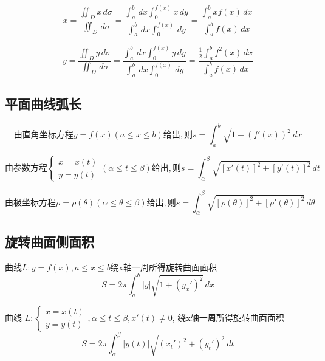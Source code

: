 \begin{displaymath}
\overline{x} = \frac{\iint_{D} x \,d\sigma}{\iint_{D} \,d\sigma} = 
\frac{\int_{a}^{b} \,dx \int_{0}^{f(x)} x \,dy}{\int_{a}^{b} \,dx \int_{0}^{f(x)} \,dy} =
\frac{\int_{a}^{b} xf(x) \,dx}{\int_{a}^{b} f(x) \,dx}
\end{displaymath}

\begin{displaymath}
\overline{y} = \frac{\iint_{D} y \,d\sigma}{\iint_{D} \,d\sigma} = 
\frac{\int_{a}^{b} \,dx \int_{0}^{f(x)} y \,dy}{\int_{a}^{b} \,dx \int_{0}^{f(x)} \,dy} =
\frac{\frac{1}{2}\int_{a}^{b} f^2(x) \,dx}{\int_{a}^{b} f(x) \,dx}
\end{displaymath}


\subsection{平面曲线弧长}

\begin{displaymath}
由直角坐标方程y = f(x)(a \leq x \leq b)给出,
则s = \int_{a}^{b} \sqrt{1 + (f'(x))^2} \,dx
\end{displaymath}

\begin{displaymath}
由参数方程
\begin{cases}
x = x(t) \\
y = y(t)
\end{cases}
(\alpha \leq t \leq \beta)给出,
则s = \int_{\alpha}^{\beta} \sqrt{[x'(t)]^2 + [y'(t)]^2} \,dt
\end{displaymath}

\begin{displaymath}
由极坐标方程\rho = \rho(\theta)(\alpha \leq \theta \leq \beta)给出,
则s = \int_{\alpha}^{\beta} \sqrt{[\rho(\theta)]^2 + [\rho'(\theta)]^2} \,d\theta
\end{displaymath}


\subsection{旋转曲面侧面积}

曲线\(L : y = f(x), a \leq x \leq b\)绕x轴一周所得旋转曲面面积
\begin{displaymath}
S = 2\pi \int_{a}^{b}|y|\sqrt{1 + (y_x')^2} \,dx
\end{displaymath}

曲线
\(
L : 
\begin{cases}
x = x(t) \\
y = y(t)
\end{cases},
\alpha \leq t \leq \beta, x'(t) \neq 0
\),
绕x轴一周所得旋转曲面面积
\begin{displaymath}
S = 2\pi \int_{\alpha}^{\beta}|y(t)|\sqrt{(x_t')^2 + (y_t')^2} \,dt
\end{displaymath}

